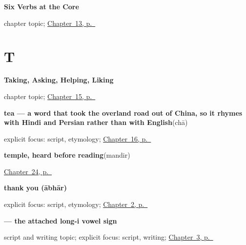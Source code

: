 \noindent\begin{minipage}[t]{\linewidth}
\raggedright
\textbf{Six Verbs at the Core}\par
\footnotesize chapter topic; \hyperref[ch:gu-core-verbs]{Chapter~13, p.~\pageref*{ch:gu-core-verbs}}
\end{minipage}\par\smallskip

\section*{T}

\noindent\begin{minipage}[t]{\linewidth}
\raggedright
\textbf{Taking, Asking, Helping, Liking}\par
\footnotesize chapter topic; \hyperref[ch:gu-doing-verbs]{Chapter~15, p.~\pageref*{ch:gu-doing-verbs}}
\end{minipage}\par\smallskip

\noindent\begin{minipage}[t]{\linewidth}
\raggedright
\textbf{tea — a word that took the overland road out of China, so it rhymes with Hindi and Persian rather than with English}\enspace\emph{}\enspace(chā)\par
\footnotesize explicit focus: script, etymology; \hyperref[ch:gu-request-food-drink]{Chapter~16, p.~\pageref*{ch:gu-request-food-drink}}
\end{minipage}\par\smallskip

\noindent\begin{minipage}[t]{\linewidth}
\raggedright
\textbf{temple, heard before reading}\enspace\emph{}\enspace(mandir)\par
\footnotesize \hyperref[ch:gu-first-three-places]{Chapter~24, p.~\pageref*{ch:gu-first-three-places}}
\end{minipage}\par\smallskip

\noindent\begin{minipage}[t]{\linewidth}
\raggedright
\textbf{thank you (ābhār)}\enspace\emph{}\par
\footnotesize explicit focus: script, etymology; \hyperref[ch:greetings]{Chapter~2, p.~\pageref*{ch:greetings}}
\end{minipage}\par\smallskip

\noindent\begin{minipage}[t]{\linewidth}
\raggedright
\textbf{ — the attached long-i vowel sign}\par
\footnotesize script and writing topic; explicit focus: script, writing; \hyperref[ch:gu-doorway-forms]{Chapter~3, p.~\pageref*{ch:gu-doorway-forms}}
\end{minipage}\par\smallskip

